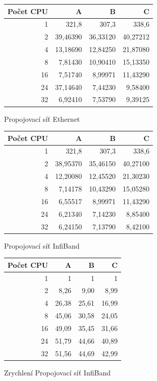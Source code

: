 \documentclass[12pt]{article}
\begin{document}
\begin{figure}
\caption{Propojovací síť Ethernet}
\begin{tabular}{|r|r|r|r|}
\hline
Počet CPU & A & B & C\\
\hline
1 & 321,8 & 307,3 & 338,6\\
\hline
2 & 39,46390 & 36,33120 & 40,27212\\
\hline
4 & 13,18690 & 12,84250 & 21,87080\\
\hline
8 & 7,81430 & 10,90410 & 15,13350\\
\hline
16 & 7,51740 & 8,99971 & 11,43290\\
\hline
24 & 37,14640 & 7,44230 & 9,58400\\
\hline
32 & 6,92410 & 7,53790 & 9,39125\\
\hline
\end{tabular} 
\end{figure}

\begin{figure}
 \caption{Propojovací síť InfiBand}
\begin{tabular}{|r|r|r|r|}
\hline
Počet CPU & A & B & C\\
\hline
1 & 321,8 & 307,3 & 338,6\\
\hline
2 & 38,95370 & 35,46150 & 40,27100\\
\hline
4 & 12,20080 & 12,45520 & 21,30230\\
\hline
8 & 7,14178 & 10,43290 & 15,05280\\
\hline
16 & 6,55517 & 8,99971 & 11,43290\\
\hline
24 & 6,21340 & 7,14230 & 8,85400\\
\hline
32 & 6,24150 & 7,13790 & 8,42100\\
\hline
\end{tabular} 
\end{figure}

\begin{figure}
 \caption{Zrychlení Propojovací síť InfiBand}
\begin{tabular}{|r|r|r|r|}
\hline
Počet CPU & A & B & C\\
\hline
1 & 1 & 1 & 1\\
\hline
2 & 8,26 & 9,00 & 8,99\\
\hline
4 & 26,38 & 25,61 & 16,99\\
\hline
8 & 45,06 & 30,58 & 24,05\\
\hline
16 & 49,09 & 35,45 & 31,66\\
\hline
24 & 51,79 & 44,66 & 40,89\\
\hline
32 & 51,56 & 44,69 & 42,99\\
\hline
\end{tabular} 
\end{figure}
\end{document}
